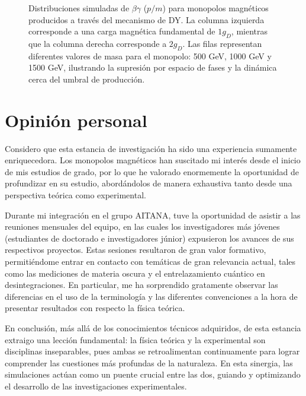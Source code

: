 \documentclass[12pt, a4paper]{article}
\begin{document}
\begin{figure}[htbp]
    \caption{Distribuciones simuladas de $\beta\gamma$ ($p/m$) para monopolos magnéticos producidos a través del mecanismo de DY. La columna izquierda corresponde a una carga magnética fundamental de $1g_D$, mientras que la columna derecha corresponde a $2g_D$. Las filas representan diferentes valores de masa para el monopolo: 500 GeV, 1000 GeV y 1500 GeV, ilustrando la supresión por espacio de fases y la dinámica cerca del umbral de producción.}
    \label{fig:betagamma_distributions}
\end{figure}



\section{Opinión personal}
Considero que esta estancia de investigación ha sido una experiencia sumamente enriquecedora. Los monopolos magnéticos han suscitado mi interés desde el inicio de mis estudios de grado, por lo que he valorado enormemente la oportunidad de profundizar en su estudio, abordándolos de manera exhaustiva tanto desde una perspectiva teórica como experimental.

Durante mi integración en el grupo AITANA, tuve la oportunidad de asistir a las reuniones mensuales del equipo, en las cuales los investigadores más jóvenes (estudiantes de doctorado e investigadores júnior) expusieron los avances de sus respectivos proyectos. Estas sesiones resultaron de gran valor formativo, permitiéndome entrar en contacto con temáticas de gran relevancia actual, tales como las mediciones de materia oscura y el entrelazamiento cuántico en desintegraciones.  En particular, me ha sorprendido gratamente observar las diferencias en el uso de la terminología y las diferentes convenciones a la hora de presentar resultados con respecto la física teórica. 

En conclusión, más allá de los conocimientos técnicos adquiridos, de esta estancia extraigo una lección fundamental: la física teórica y la experimental son disciplinas inseparables, pues ambas se retroalimentan continuamente para lograr comprender las cuestiones más profundas de la naturaleza. En esta sinergia, las simulaciones actúan como un puente crucial entre las dos, guiando y optimizando el desarrollo de las investigaciones experimentales.
\end{document}
